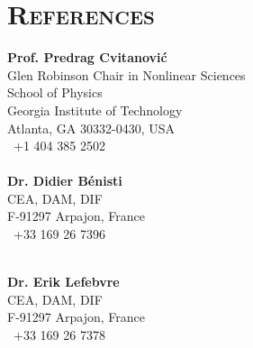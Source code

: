 \documentclass[11pt,a4paper,final]{moderncv}
\begin{document}
\section{\textsc{References}}
\begin{minipage}{\textwidth}
\begin{multicols*}{2} %
\textbf{Prof. Predrag Cvitanovi\'c}\vspace{1pt}\\ 
Glen Robinson Chair in Nonlinear Sciences\\
School of Physics\\
Georgia Institute of Technology\\
Atlanta, GA 30332-0430, USA\\
\phonesymbol\ +1 404 385 2502\\
\\

\textbf{Dr. Didier B\'enisti}\vspace{1pt}\\
CEA, DAM, DIF\\
F-91297 Arpajon, France\\
\phonesymbol\ +33 169 26 7396\\
\\


\columnbreak %
% 

\textbf{Dr. Erik Lefebvre}\vspace{1pt}\\
CEA, DAM, DIF\\
F-91297 Arpajon, France\\
\phonesymbol\ +33 169 26 7378\\
\\



\end{multicols*}
\end{minipage}
\end{document}
